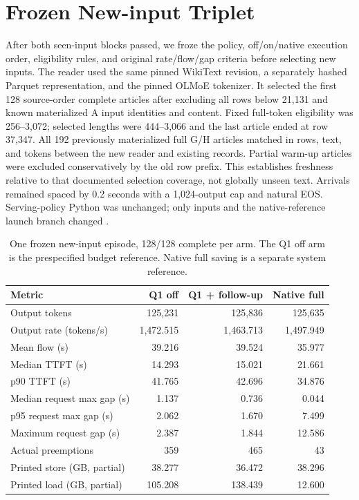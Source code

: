 \documentclass[10pt]{article}
\begin{document}
\section{Frozen New-input Triplet}
After both seen-input blocks passed, we froze the policy, off/on/native execution order, eligibility rules, and original rate/flow/gap criteria before selecting new inputs. The reader used the same pinned WikiText revision, a separately hashed Parquet representation, and the pinned OLMoE tokenizer. It selected the first 128 source-order complete articles after excluding all rows below 21,131 and known materialized A input identities and content. Fixed full-token eligibility was 256--3,072; selected lengths were 444--3,066 and the last article ended at row 37,347. All 192 previously materialized full G/H articles matched in rows, text, and tokens between the new reader and existing records. Partial warm-up articles were excluded conservatively by the old row prefix. This establishes freshness relative to that documented selection coverage, not globally unseen text. Arrivals remained spaced by 0.2 seconds with a 1,024-output cap and natural EOS. Serving-policy Python was unchanged; only inputs and the native-reference launch branch changed \cite{sparefresh}.

\begin{table}[t]
\centering\small
\caption{One frozen new-input episode, 128/128 complete per arm. The Q1 off arm is the prespecified budget reference. Native full saving is a separate system reference.}
\label{tab:sparefresh}
\begin{tabular}{lrrr}
\toprule
Metric & Q1 off & Q1 + follow-up & Native full \\
\midrule
Output tokens & 125,231 & 125,836 & 125,635 \\
Output rate (tokens/s) & 1,472.515 & 1,463.713 & 1,497.949 \\
Mean flow (s) & 39.216 & 39.524 & 35.977 \\
Median TTFT (s) & 14.293 & 15.021 & 21.661 \\
p90 TTFT (s) & 41.765 & 42.696 & 34.876 \\
Median request max gap (s) & 1.137 & 0.736 & 0.044 \\
p95 request max gap (s) & 2.062 & 1.670 & 7.499 \\
Maximum request gap (s) & 2.387 & 1.844 & 12.586 \\
Actual preemptions & 359 & 465 & 43 \\
Printed store (GB, partial) & 38.277 & 36.472 & 38.296 \\
Printed load (GB, partial) & 105.208 & 138.439 & 12.600 \\
\bottomrule
\end{tabular}
\end{table}
\end{document}
